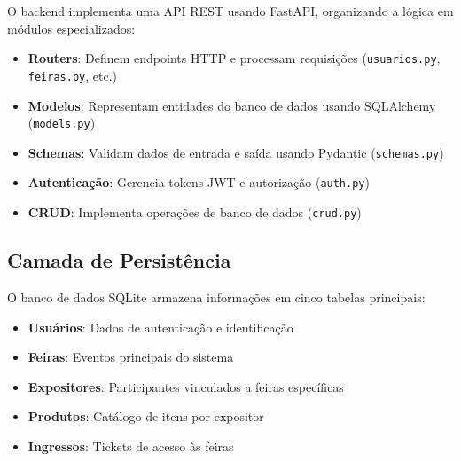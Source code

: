 \documentclass[12pt,a4paper]{article}
\begin{document}
O backend implementa uma API REST usando FastAPI, organizando a lógica em módulos especializados:

\begin{itemize}
    \item \textbf{Routers}: Definem endpoints HTTP e processam requisições (\texttt{usuarios.py}, \texttt{feiras.py}, etc.)
    \item \textbf{Modelos}: Representam entidades do banco de dados usando SQLAlchemy (\texttt{models.py})
    \item \textbf{Schemas}: Validam dados de entrada e saída usando Pydantic (\texttt{schemas.py})
    \item \textbf{Autenticação}: Gerencia tokens JWT e autorização (\texttt{auth.py})
    \item \textbf{CRUD}: Implementa operações de banco de dados (\texttt{crud.py})
\end{itemize}

\subsection{Camada de Persistência}

O banco de dados SQLite armazena informações em cinco tabelas principais:

\begin{itemize}
    \item \textbf{Usuários}: Dados de autenticação e identificação
    \item \textbf{Feiras}: Eventos principais do sistema
    \item \textbf{Expositores}: Participantes vinculados a feiras específicas
    \item \textbf{Produtos}: Catálogo de itens por expositor
    \item \textbf{Ingressos}: Tickets de acesso às feiras
\end{itemize}
\end{document}
